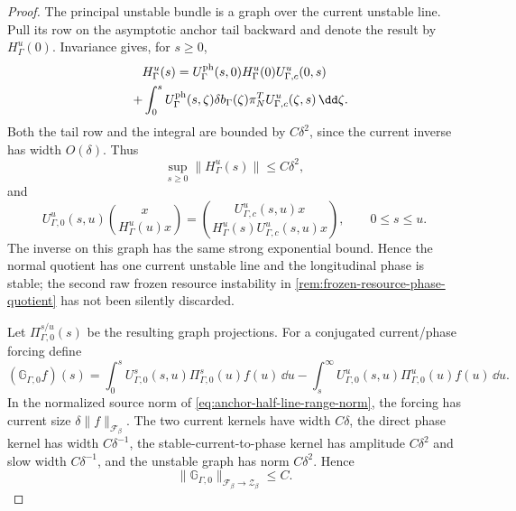 \begin{proof}
The principal unstable bundle is a graph over the current unstable line.
Pull its row on the asymptotic anchor tail backward and denote the result by
\(H_\Gamma^u(0)\).  Invariance gives, for \(s\ge0\),
\begin{multline}
 H_\Gamma^u(s)=U_\Gamma^{\rm ph}(s,0)H_\Gamma^u(0)
       U_{\Gamma,c}^{u}(0,s)\\
 \quad+\int_0^sU_\Gamma^{\rm ph}(s,\zeta)
       \delta b_\Gamma(\zeta)\pi_N^T
       U_{\Gamma,c}^{u}(\zeta,s)\,\dd\zeta .          \label{eq:anchor-reference-unstable-graph-row}
\end{multline}
Both the tail row and the integral are bounded by \(C\delta^2\), since the
current inverse has width \(O(\delta)\).  Thus
\begin{equation}
 \sup_{s\ge0}\|H_\Gamma^u(s)\|\le C\delta^2,          \label{eq:anchor-reference-unstable-graph-bound}
\end{equation}
and
\begin{equation}
 U_{\Gamma,0}^{u}(s,u)
  \binom{x}{H_\Gamma^u(u)x}
 =\binom{U_{\Gamma,c}^{u}(s,u)x}
          {H_\Gamma^u(s)U_{\Gamma,c}^{u}(s,u)x},
 \qquad 0\le s\le u.                                 \label{eq:anchor-reference-full-unstable-inverse}
\end{equation}
The inverse on this graph has the same strong exponential bound.  Hence the
normal quotient has one current unstable line and the longitudinal phase is
stable; the second raw frozen resource instability in
\cref{rem:frozen-resource-phase-quotient} has not been silently discarded.

Let \(\Pi_{\Gamma,0}^{s/u}(s)\) be the resulting graph projections.  For a
conjugated current/phase forcing define
\begin{equation}
 (\mathbb G_{\Gamma,0}f)(s)
 =\int_0^sU_{\Gamma,0}^s(s,u)\Pi_{\Gamma,0}^s(u)f(u)\,\dd u
 -\int_s^\infty U_{\Gamma,0}^u(s,u)
       \Pi_{\Gamma,0}^u(u)f(u)\,\dd u .                \label{eq:anchor-reference-principal-Green}
\end{equation}
In the normalized source norm of
\cref{eq:anchor-half-line-range-norm}, the forcing has current size
\(\delta\|f\|_{\mathscr F_\beta}\).  The two current kernels have width
\(C\delta\), the direct phase kernel has width \(C\delta^{-1}\), the
stable-current-to-phase kernel has amplitude \(C\delta^2\) and slow width
\(C\delta^{-1}\), and the unstable graph has norm \(C\delta^2\).  Hence
\begin{equation}
 \|\mathbb G_{\Gamma,0}\|_{\mathscr F_\beta\to\mathscr Z_\beta}
 \le C.                                               \label{eq:anchor-reference-principal-Green-bound}
\end{equation}


\end{proof}
